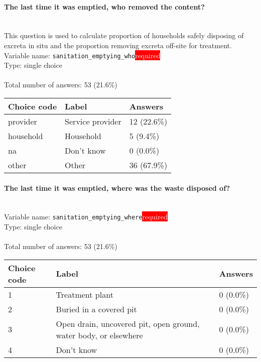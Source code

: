 \documentclass[11.5pt, a4paper]{scrartcl}
\begin{document}
\paragraph{The last time it was emptied, who removed the content? }
\ \\ {\small This question is used to calculate proportion of households safely disposing of excreta in situ and the proportion removing excreta off-site for treatment.}
\  \\Variable name: \texttt{sanitation\_emptying\_who}\hfill\colorbox{red}{\small{\textcolor{white}{required}}}\\
 Type: single choice\\
\\Total number of answers: 53 (21.6\%)
\\[0.2em] \begin{tabular}{p{4cm}|p{8cm}|p{3cm}}
Choice code & Label & Answers \\
\hline
provider & Service provider& \cellcolor{color1}12 (22.6\%)\\
\cellcolor{mygray} household & \cellcolor{mygray}Household & \cellcolor{color0}5 (9.4\%)\\
na & Don’t know & \cellcolor{color0}0 (0.0\%)\\
\cellcolor{mygray} other & \cellcolor{mygray}Other  & \cellcolor{color3}36 (67.9\%)\\
\end{tabular}
\paragraph{The last time it was emptied, where was the waste disposed of? }
\  \\Variable name: \texttt{sanitation\_emptying\_where}\hfill\colorbox{red}{\small{\textcolor{white}{required}}}\\
 Type: single choice\\
\\Total number of answers: 53 (21.6\%)
\\[0.2em] \begin{tabular}{p{4cm}|p{8cm}|p{3cm}}
Choice code & Label & Answers \\
\hline
1 & Treatment plant& \cellcolor{color0}0 (0.0\%)\\
\cellcolor{mygray} 2 & \cellcolor{mygray}Buried in a covered pit & \cellcolor{color0}0 (0.0\%)\\
3 & Open drain, uncovered pit, open ground, water body, or elsewhere & \cellcolor{color0}0 (0.0\%)\\
\cellcolor{mygray} 4 & \cellcolor{mygray}Don’t know & \cellcolor{color0}0 (0.0\%)\\
\end{tabular}
\end{document}
